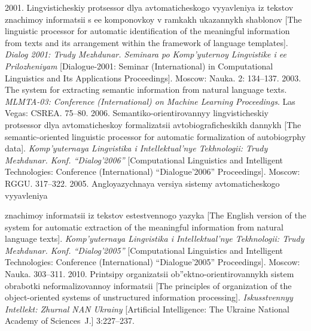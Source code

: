 \begin{multicols}{2}
{{\begin{thebibliography}{99}
 2001. Lingvisticheskiy protsessor dlya avtomaticheskogo vyyavleniya iz tekstov
znachimoy informatsii s ee komponovkoy v ramkakh ukazannykh shablonov [The
linguistic processor for automatic identification of the meaningful information
from texts and its arrangement within the framework of language templates].
\textit{Dialog 2001: Trudy Mezhdunar. Seminara po Komp'yuternoy Lingvistike i ee
Prilozheniyam} [Dialogue-2001:  Seminar (International) in
Computational Linguistics and Its Applications Proceedings].
 Moscow: Nauka.
2: 134--137.
 2003. The system for extracting semantic information from natural language texts.
\textit{MLMTA-03:  Conference (International) on Machine Learning Proceedings}. Las
Vegas: CSREA. 75--80.
 2006. Semantiko-orientirovannyy lingvisticheskiy protsessor dlya avtomaticheskoy
formalizatsii avtobiograficheskikh dannykh [The semantic-oriented linguistic
processor for automatic formalization of autobiogrphy data].
\textit{Komp'yuternaya
Lingvistika i Intellektual'nye Tekhnologii: Trudy Mezhdunar. Konf.
``Dialog'2006''} [Computational Linguistics and Intelligent Technologies:
 Conference (International) ``Dialogue'2006'' Proceedings]. Moscow: RGGU.
317--322.
 2005. Anglo\-yazych\-naya versiya sistemy avtomaticheskogo vyyavleniya\linebreak\vspace*{-12pt}

 \pagebreak

 \noindent
znachimoy informatsii iz tekstov estestvennogo yazyka [The English
version of the system for automatic extraction of the meaningful information from
natural language texts].
\textit{Komp'yuternaya Lingvistika i Intellektual'nye Tekhnologii:
Trudy Mezhdunar. Konf. ``Dialog'2005''} [Computational Linguistics and
Intelligent Technologies:   Conference (International)
``Dialogue'2005'' Proceedings]. Moscow: Nauka. 303--311.
 2010. Printsipy organizatsii ob''ektno-orientirovannykh sistem obrabotki
neformalizovannoy informatsii [The principles of organization of the
object-oriented systems of unstructured information processing].
\textit{Iskusstvennyy Intellekt: Zhurnal NAN Ukrainy}
[Artificial Intelligence: The Ukraine National Academy of
Sciences~J.] 3:227--237.

 \end{thebibliography}
 } }


 \end{multicols}

